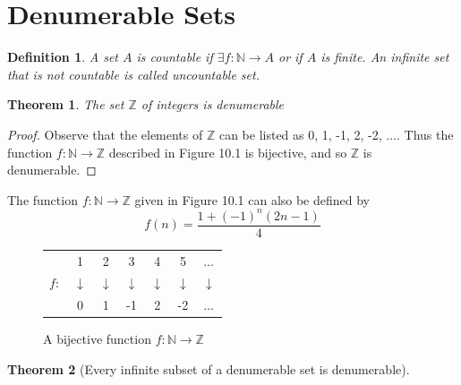 \documentclass[10pt]{report}
\newtheorem{thm2}{Theorem}[section]
\newtheorem{def2}{Definition}[section]
\begin{document}
\section{Denumerable Sets}
\begin{def2}
A set $A$ is countable if $\exists f: \mathbb{N} \to A$ or if $A$ is finite. An infinite set that is not countable is called uncountable set.
\end{def2}
\begin{thm2}
The set $\mathbb{Z}$ of integers is denumerable
\end{thm2}
\begin{proof}
Observe that the elements of $\mathbb{Z}$ can be listed as 0, 1, -1, 2, -2, .... Thus the function $f:\mathbb{N}\to\mathbb{Z}$ described in Figure 10.1 is bijective, and so $\mathbb{Z}$ is denumerable.
\end{proof}
The function $f:\mathbb{N} \to \mathbb{Z}$ given in Figure 10.1 can also be defined by
$$f(n)=\frac{1+(-1)^n(2n-1)}{4}$$
\begin{figure}[h]\begin{center}
\begin{tabular}{c c c c c c c}
& 1 & 2 & 3 & 4 & 5 & $\dots$\\
$f:$ & $\downarrow$ & $\downarrow$ & $\downarrow$ & $\downarrow$ & $\downarrow$ & $\downarrow$\\ 
& 0 & 1 & -1 & 2 & -2 & $\dots$
\end{tabular}
\end{center}
\caption{A bijective function $f:\mathbb{N} \to \mathbb{Z}$}
\end{figure}
\begin{thm2}[Every infinite subset of a denumerable set is denumerable]
\end{thm2}
\end{document}
